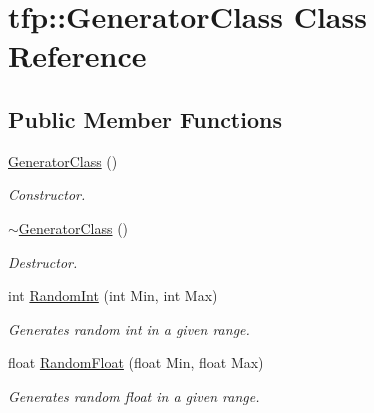 \hypertarget{classtfp_1_1_generator_class}{}\section{tfp\+:\+:Generator\+Class Class Reference}
\label{classtfp_1_1_generator_class}
\subsection*{Public Member Functions}
\begin{DoxyCompactItemize}
\item 
\mbox{\label{classtfp_1_1_generator_class_a56bdbe6f2d3d7a411f435c45a26ff267}} 
\mbox{\hyperlink{classtfp_1_1_generator_class_a56bdbe6f2d3d7a411f435c45a26ff267}{Generator\+Class}} ()
\begin{DoxyCompactList}\small\item\em Constructor. \end{DoxyCompactList}\item 
\mbox{\label{classtfp_1_1_generator_class_a6d6c10b7debf2044a546e5c983f23c42}} 
\mbox{\hyperlink{classtfp_1_1_generator_class_a6d6c10b7debf2044a546e5c983f23c42}{$\sim$\+Generator\+Class}} ()
\begin{DoxyCompactList}\small\item\em Destructor. \end{DoxyCompactList}\item 
\mbox{\label{classtfp_1_1_generator_class_a0c059d92cf17315e09005e414aa82651}} 
int \mbox{\hyperlink{classtfp_1_1_generator_class_a0c059d92cf17315e09005e414aa82651}{Random\+Int}} (int Min, int Max)
\begin{DoxyCompactList}\small\item\em Generates random int in a given range. \end{DoxyCompactList}\item 
\mbox{\label{classtfp_1_1_generator_class_a1b89b4a00f74ed18e0c321cb675594aa}} 
float \mbox{\hyperlink{classtfp_1_1_generator_class_a1b89b4a00f74ed18e0c321cb675594aa}{Random\+Float}} (float Min, float Max)
\begin{DoxyCompactList}\small\item\em Generates random float in a given range. \end{DoxyCompactList}\item 

\end{DoxyCompactItemize}
